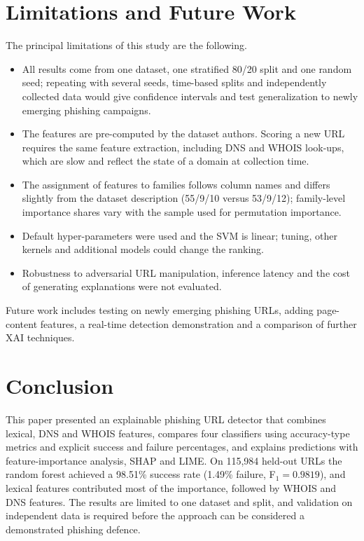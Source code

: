\documentclass[journal]{IEEEtran}
\begin{document}
\section{Limitations and Future Work}
The principal limitations of this study are the following.
\begin{itemize}
\item All results come from one dataset, one stratified 80/20 split and one random seed; repeating with several seeds, time-based splits and independently collected data would give confidence intervals and test generalization to newly emerging phishing campaigns.
\item The features are pre-computed by the dataset authors. Scoring a new URL requires the same feature extraction, including DNS and WHOIS look-ups, which are slow and reflect the state of a domain at collection time.
\item The assignment of features to families follows column names and differs slightly from the dataset description (55/9/10 versus 53/9/12); family-level importance shares vary with the sample used for permutation importance.
\item Default hyper-parameters were used and the SVM is linear; tuning, other kernels and additional models could change the ranking.
\item Robustness to adversarial URL manipulation, inference latency and the cost of generating explanations were not evaluated.
\end{itemize}
Future work includes testing on newly emerging phishing URLs, adding page-content features, a real-time detection demonstration and a comparison of further XAI techniques.

\section{Conclusion}
This paper presented an explainable phishing URL detector that combines lexical, DNS and WHOIS features, compares four classifiers using accuracy-type metrics and explicit success and failure percentages, and explains predictions with feature-importance analysis, SHAP and LIME. On 115,984 held-out URLs the random forest achieved a 98.51\% success rate (1.49\% failure, F$_1=0.9819$), and lexical features contributed most of the importance, followed by WHOIS and DNS features. The results are limited to one dataset and split, and validation on independent data is required before the approach can be considered a demonstrated phishing defence.
\end{document}
